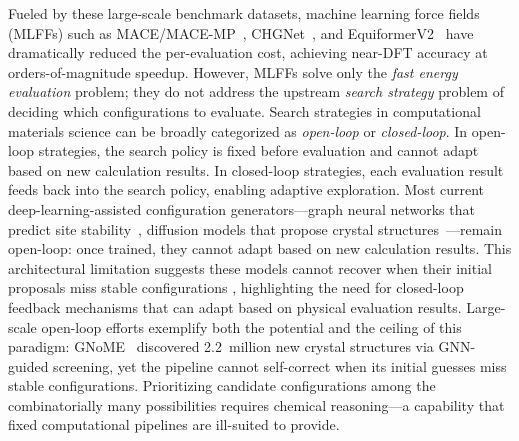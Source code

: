 Fueled by these large-scale benchmark datasets, machine learning force fields (MLFFs) such as MACE/MACE-MP~\cite{batatia2022mace,batatia2023foundation}, CHGNet~\cite{deng2023chgnet}, and EquiformerV2~\cite{liao2023equiformerv2} have dramatically reduced the per-evaluation cost, achieving near-DFT accuracy at orders-of-magnitude speedup.
However, MLFFs solve only the \textit{fast energy evaluation} problem; they do not address the upstream \textit{search strategy} problem of deciding which configurations to evaluate.
Search strategies in computational materials science can be broadly categorized as \textit{open-loop} or \textit{closed-loop}.
In open-loop strategies, the search policy is fixed before evaluation and cannot adapt based on new calculation results.
In closed-loop strategies, each evaluation result feeds back into the search policy, enabling adaptive exploration.
Most current deep-learning-assisted configuration generators---graph neural networks that predict site stability~\cite{reiser2022gnn,gasteiger2022gemnet}, diffusion models that propose crystal structures~\cite{xie2022cdvae,zeni2025mattergen}---remain open-loop: once trained, they cannot adapt based on new calculation results.
This architectural limitation suggests these models cannot recover when their initial proposals miss stable configurations \cite{abolhasani2023rise}, highlighting the need for closed-loop feedback mechanisms that can adapt based on physical evaluation results. 
Large-scale open-loop efforts exemplify both the potential and the ceiling of this paradigm: GNoME~\cite{merchant2023gnome} discovered 2.2~million new crystal structures via GNN-guided screening, yet the pipeline cannot self-correct when its initial guesses miss stable configurations.
Prioritizing candidate configurations among the combinatorially many possibilities requires chemical reasoning---a capability that fixed computational pipelines are ill-suited to provide.

